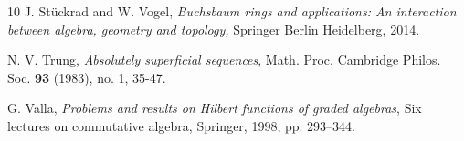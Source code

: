 \documentclass[11pt]{amsart}
\theoremstyle{plain}
\theoremstyle{plain}
\begin{document}
\begin{thebibliography}{10}
  J. St\"uckrad and W. Vogel, \emph{Buchsbaum rings and applications: An interaction between algebra, geometry and topology,}
Springer Berlin Heidelberg, 2014.

 N. V. Trung, \emph{Absolutely superficial sequences}, Math. Proc. Cambridge Philos. Soc. \textbf{93} (1983), no. 1, 35-47.

  G. Valla, \emph{Problems and results on Hilbert functions of graded algebras}, Six lectures on commutative algebra, Springer, 1998, pp. 293–344.








\end{thebibliography}
\end{document}
